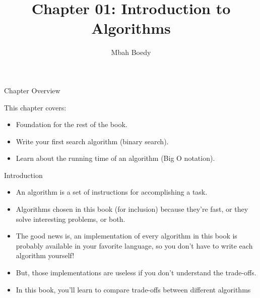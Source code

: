 \documentclass[ignorenonframetext,]{beamer}
\title{Chapter 01: Introduction to Algorithms}
\author{Mbah Boedy}
\date{}
\providecommand{\tightlist}{%
  \setlength{\itemsep}{0pt}\setlength{\parskip}{0pt}}
\begin{document}
\frame{\titlepage}

\begin{frame}

\end{frame}

\begin{frame}{Chapter Overview}
\protect\hypertarget{chapter-overview}{}

This chapter covers:

\begin{itemize}
\tightlist
\item
  Foundation for the rest of the book.
\item
  Write your first search algorithm (binary search).
\item
  Learn about the running time of an algorithm (Big O notation).
\end{itemize}

\end{frame}

\begin{frame}{Introduction}
\protect\hypertarget{introduction}{}

\begin{itemize}
\tightlist
\item
  An algorithm is a set of instructions for accomplishing a task.
\item
  Algorithms chosen in this book (for inclusion) because they're fast,
  or they solve interesting problems, or both.
\item
  The good news is, an implementation of every algorithm in this book is
  probably available in your favorite language, so you don't have to
  write each algorithm yourself!
\item
  But, those implementations are useless if you don't understand the
  trade-offs.
\item
  In this book, you'll learn to compare trade-offs between different
  algorithms
\end{itemize}

\end{frame}
\end{document}

